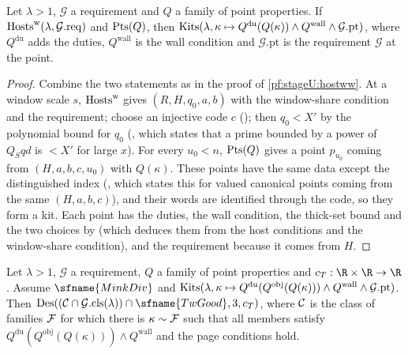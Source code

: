 \begin{lemma}[Kits]\label{pf:stageU:kits}
Let $\lambda>1$, $\mathcal G$ a requirement and $Q$ a family of point properties. If
$\mathrm{Hosts}^{\mathrm w}(\lambda,\mathcal G.\mathrm{req})$ and $\mathrm{Pts}(Q)$, then
$\mathrm{Kits}(\lambda,\kappa\mapsto Q^{\mathrm{du}}(Q(\kappa))\wedge Q^{\mathrm{wall}}\wedge\mathcal G.\mathrm{pt})$, where
$Q^{\mathrm{du}}$ adds the duties, $Q^{\mathrm{wall}}$ is the wall condition and $\mathcal G.\mathrm{pt}$ is the requirement
$\mathcal G$ at the point.
\end{lemma}

\begin{proof}
Combine the two statements as in the proof of \cref{pf:stageU:hostww}. At a window scale $s$,
$\mathrm{Hosts}^{\mathrm w}$ gives $(R,H,q_0,a,b)$ with the window-share condition and the requirement; choose an injective
code $c$ (); then $q_0<X'$ by the polynomial bound for $q_0$
(, which states that a prime bounded by a power of $Q_Sqd$ is $<X'$ for large
$x$). For every $u_0<n$, $\mathrm{Pts}(Q)$ gives a point $p_{u_0}$ coming from $(H,a,b,c,u_0)$ with $Q(\kappa)$. These points
have the same data except the distinguished index (, which states this for
valued canonical points coming from the same $(H,a,b,c)$), and their words are identified through the code, so they form
a kit. Each point has the duties, the wall condition, the thick-set bound and the two choices by
 (which deduces them from the host conditions and the
window-share condition), and the requirement because it comes from $H$.
\end{proof}

\begin{lemma}\label{pf:stageU:designs}
Let $\lambda>1$, $\mathcal G$ a requirement, $Q$ a family of point properties and $c_T:\R\times\R\to\R$. Assume
$\sfname{MinkDiv}$ and $\mathrm{Kits}(\lambda,\kappa\mapsto Q^{\mathrm{du}}(Q^{\mathrm{obj}}(Q(\kappa)))\wedge Q^{\mathrm{wall}}\wedge
\mathcal G.\mathrm{pt})$. Then $\stageUDes((\stageUC\cap\mathcal G.\mathrm{cls}(\lambda))\cap\sfname{TwGood},3,c_T)$, where
$\mathcal{C}$ is the class of families $\mathcal{F}$ for which there is $\kappa\sim\mathcal{F}$ such that all members satisfy
$Q^{\mathrm{du}}(Q^{\mathrm{obj}}(Q(\kappa)))\wedge Q^{\mathrm{wall}}$ and the page conditions hold.
\end{lemma}

